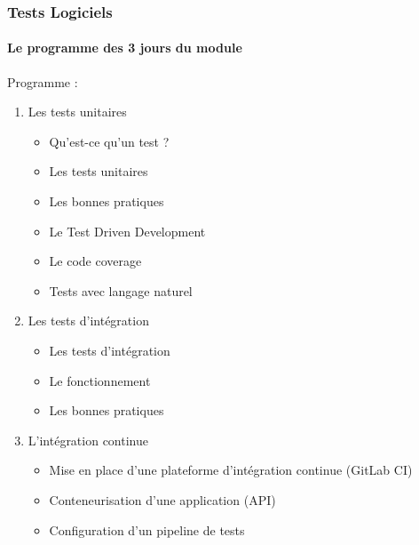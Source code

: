 \documentclass{beamer}
\begin{document}
    \begin{frame}
        \frametitle{Tests Logiciels}
        \framesubtitle{Le programme des 3 jours du module}
        \transdissolve
        Programme :
        \begin{enumerate}
            \item Les tests unitaires
            \begin{itemize}
                \item Qu’est-ce qu’un test ?
                \item Les tests unitaires
                \item Les bonnes pratiques
                \item Le Test Driven Development
                \item Le code coverage
                \item Tests avec langage naturel
            \end{itemize}
            \item  Les tests d’intégration
            \begin{itemize}
                \item  Les tests d’intégration
                \item  Le fonctionnement
                \item  Les bonnes pratiques
            \end{itemize}
            \item L’intégration continue
            \begin{itemize}
                \item  Mise en place d’une plateforme d’intégration continue (GitLab CI)
                \item  Conteneurisation d’une application (API)
                \item  Configuration d’un pipeline de tests
            \end{itemize}
        \end{enumerate}
    \end{frame}
\end{document}
